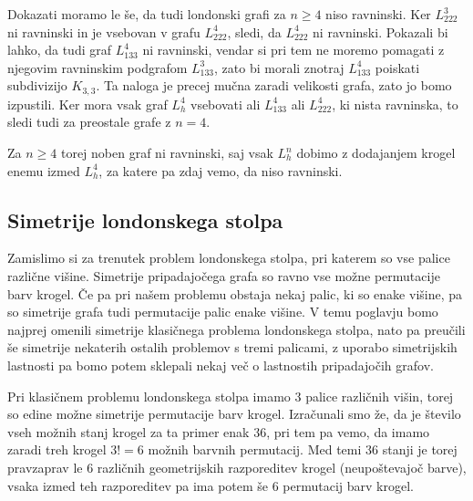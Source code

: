 \documentclass[12pt,a4paper]{amsart}
\theoremstyle{definition} %
\newtheorem{opomba}[definicija]{Opomba}
\theoremstyle{plain} %
\begin{document}
    Dokazati moramo le še, da tudi londonski grafi za $n\geq 4$ niso ravninski.
    Ker $L_{222}^3$ ni ravninski in je vsebovan v grafu $L_{222}^4$, sledi, da $L_{222}^4$ ni ravninski. Pokazali bi lahko, da tudi graf $L_{133}^4$ ni ravninski, vendar si pri tem ne moremo pomagati z njegovim ravninskim podgrafom $L_{133}^3$, zato bi morali znotraj $L_{133}^4$ poiskati subdivizijo $K_{3,3}$. Ta naloga je precej mučna zaradi velikosti grafa, zato jo bomo izpustili.
    Ker mora vsak graf $L_h^4$ vsebovati ali $L_{133}^4$ ali $L_{222}^4$, ki nista ravninska, to sledi tudi za preostale grafe z $n=4$.
    
    Za $n \geq 4$ torej noben graf ni ravninski, saj vsak $L_h^n$ dobimo z dodajanjem krogel enemu izmed $L_h^4$, za katere pa zdaj vemo, da niso ravninski.
\endproof


\subsection{Simetrije londonskega stolpa}

Zamislimo si za trenutek problem londonskega stolpa, pri katerem so vse palice različne višine. Simetrije pripadajočega grafa so ravno vse možne permutacije barv krogel.
Če pa pri našem problemu obstaja nekaj palic, ki so enake višine, pa so simetrije grafa tudi permutacije palic enake višine.
V temu poglavju bomo najprej omenili simetrije klasičnega problema londonskega stolpa, nato pa preučili še simetrije nekaterih ostalih problemov s tremi palicami, z uporabo simetrijskih lastnosti pa bomo potem sklepali nekaj več o lastnostih pripadajočih grafov.

Pri klasičnem problemu londonskega stolpa imamo $3$ palice različnih višin, torej so edine možne simetrije permutacije barv krogel. 
Izračunali smo že, da je število vseh možnih stanj krogel za ta primer enak 36, pri tem pa vemo, da imamo zaradi treh krogel $3! = 6$ možnih barvnih permutacij. Med temi $36$ stanji je torej pravzaprav le $6$ različnih geometrijskih razporeditev krogel (neupoštevajoč barve), vsaka izmed teh razporeditev pa ima potem še $6$ permutacij barv krogel.
\end{document}
